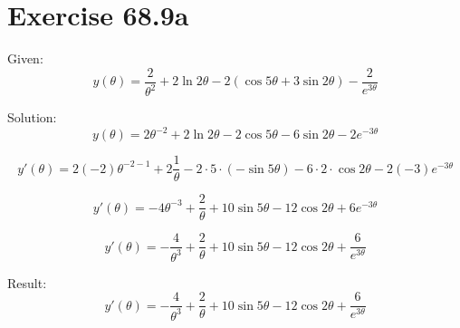 \documentclass[a4paper, 10pt]{scrartcl}
\begin{document}
\section{Exercise 68.9a}

Given:
\[y(\theta) = \frac{2}{\theta^{2}} + 2\ln{2\theta} -
              2(\cos{5\theta} + 3\sin{2\theta}) - \frac{2}{e^{3\theta}}\]

Solution:
\[y(\theta) = 2\theta^{-2} + 2\ln{2\theta} -
              2\cos{5\theta} - 6\sin{2\theta} - 2e^{-3\theta}\]

\[y'(\theta) = 2(-2)\theta^{-2 - 1} + 2\frac{1}{\theta} -
              2\cdot5\cdot(-\sin{5\theta}) - 6\cdot2\cdot \cos{2\theta} - 2(-3)e^{-3\theta}\]

\[y'(\theta) = -4\theta^{-3} + \frac{2}{\theta} +
              10\sin{5\theta} - 12\cos{2\theta} + 6e^{-3\theta}\]

\[y'(\theta) = -\frac{4}{\theta^{3}} + \frac{2}{\theta} +
              10\sin{5\theta} - 12\cos{2\theta} + \frac{6}{e^{3\theta}}\]

Result:
\[y'(\theta) = -\frac{4}{\theta^{3}} + \frac{2}{\theta} +
              10\sin{5\theta} - 12\cos{2\theta} + \frac{6}{e^{3\theta}}\]
\end{document}
